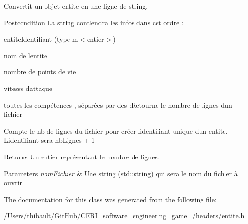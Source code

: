 Convertit un objet entite en une ligne de string. \begin{DoxyPostcond}{Postcondition}
La string contiendra les infos dans cet ordre \+:
\begin{DoxyItemize}
\item entite\+Identifiant (type {\ttfamily m$<$entier$>$})
\item nom de l\textquotesingle{}entite
\item nombre de points de vie
\item vitesse d\textquotesingle{}attaque
\item toutes les compétences , séparées par des {\ttfamily \+:}Retourne le nombre de lignes d\textquotesingle{}un fichier.
\end{DoxyItemize}
\end{DoxyPostcond}
Compte le nb de lignes du fichier pour créer l\textquotesingle{}identifiant unique d\textquotesingle{}un entite. L\textquotesingle{}identifiant sera {\ttfamily  nb\+Lignes + 1 } \begin{DoxyReturn}{Returns}
Un entier représentant le nombre de lignes. 
\end{DoxyReturn}

\begin{DoxyParams}{Parameters}
{\em nom\+Fichier} & Une string (std\+::string) qui sera le nom du fichier à ouvrir. \\
\hline
\end{DoxyParams}


The documentation for this class was generated from the following file\+:\begin{DoxyCompactItemize}
\item 
/\+Users/thibault/\+Git\+Hub/\+C\+E\+R\+I\+\_\+software\+\_\+engineering\+\_\+game\+\_/headers/entite.\+h\end{DoxyCompactItemize}
